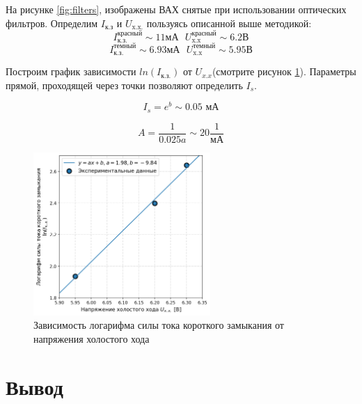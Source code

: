 \documentclass[a4paper, 12pt]{extarticle}
\begin{document}
На рисунке \ref{fig:filters}, изображены ВАХ снятые при использовании оптических фильтров. Определим $I_{\text{к.з}}$ и $U_{\text{x.x.}}$ пользуясь описанной выше методикой:
$$
I_{\text{к.з.}}^{\text{красный}} \sim 11 \text{мА} \text{   } U_{\text{x.x}}^{\text{красный}} \sim 6.2 \text{В}
$$
$$
I_{\text{к.з.}}^{\text{темный}} \sim 6.93 \text{мА} \text{   } U_{\text{x.x}}^{\text{темный}} \sim 5.95 \text{В}
$$


Построим график зависимости $ln(I_{\text{к.з.}})$ от $U_{x.x}$(смотрите рисунок \ref{fig:line}). Параметры прямой, проходящей через точки позволяют определить $I_s$.

\begin{equation}
    I_{s} = e^{b} \sim 0.05 \text{ мА}
\end{equation}

\begin{equation}
    A = \frac{1}{0.025 a} \sim 20\frac{1}{\text{мА}}
\end{equation}


\begin{figure}[htbp]
    \centering
    \includegraphics[width = 0.6\textwidth]{pics/line.png}
    \caption{Зависимость логарифма силы тока короткого замыкания от напряжения холостого хода}
    \label{fig:line}
\end{figure}
\section*{\textcolor{header}{Вывод}}
\end{document}
